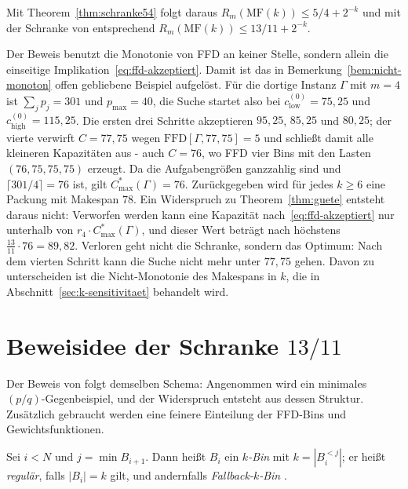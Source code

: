Mit Theorem~\ref{thm:schranke54} folgt daraus $R_m(\mathrm{MF}(k)) \le 5/4 + 2^{-k}$ und mit der
Schranke von \textcite{cao1995} entsprechend $R_m(\mathrm{MF}(k)) \le 13/11 + 2^{-k}$.

Der Beweis benutzt die Monotonie von FFD an keiner Stelle, sondern allein die einseitige
Implikation~\eqref{eq:ffd-akzeptiert}.
Damit ist das in Bemerkung~\ref{bem:nicht-monoton} offen gebliebene Beispiel aufgelöst.
Für die dortige Instanz $\Gamma$ mit $m = 4$ ist $\sum_j p_j = 301$ und $p_{\max} = 40$, die Suche
startet also bei $c_{\mathrm{low}}^{(0)} = 75{,}25$ und $c_{\mathrm{high}}^{(0)} = 115{,}25$.
Die ersten drei Schritte akzeptieren $95{,}25$, $85{,}25$ und $80{,}25$; der vierte verwirft
$C = 77{,}75$ wegen $\mathrm{FFD}[\Gamma, 77{,}75] = 5$ und schließt damit alle kleineren
Kapazitäten aus - auch $C = 76$, wo FFD vier Bins mit den Lasten $(76, 75, 75, 75)$ erzeugt.
Da die Aufgabengrößen ganzzahlig sind und $\lceil 301/4 \rceil = 76$ ist, gilt
$C^{*}_{\max}(\Gamma) = 76$.
Zurückgegeben wird für jedes $k \ge 6$ eine Packung mit Makespan $78$.
Ein Widerspruch zu Theorem~\ref{thm:guete} entsteht daraus nicht: Verworfen werden kann eine
Kapazität nach~\eqref{eq:ffd-akzeptiert} nur unterhalb von $r_4 \cdot C^{*}_{\max}(\Gamma)$, und
dieser Wert beträgt nach \textcite{cao1995} höchstens $\frac{13}{11} \cdot 76 = 89{,}82$.
Verloren geht nicht die Schranke, sondern das Optimum: Nach dem vierten Schritt kann die Suche
nicht mehr unter $77{,}75$ gehen.
Davon zu unterscheiden ist die Nicht-Monotonie des Makespans in $k$, die in
Abschnitt~\ref{sec:k-sensitivitaet} behandelt wird.

\section{Beweisidee der Schranke \texorpdfstring{$13/11$}{13/11}}
\label{sec:beweisidee1311}

Der Beweis von \textcite{cao1995} folgt demselben Schema: Angenommen wird ein minimales
$(p/q)$-Gegenbeispiel, und der Widerspruch entsteht aus dessen Struktur.
Zusätzlich gebraucht werden eine feinere Einteilung der FFD-Bins und Gewichtsfunktionen.

\begin{definition}[$k$-Bin]
\label{def:k-bin}
Sei $i < N$ und $j = \min B_{i+1}$.
Dann heißt $B_i$ ein \emph{$k$-Bin} mit $k = |B_i^{<j}|$; er heißt \emph{regulär}, falls
$|B_i| = k$ gilt, und andernfalls \emph{Fallback-$k$-Bin} \cite[S.~80]{cao1995}.
\end{definition}

